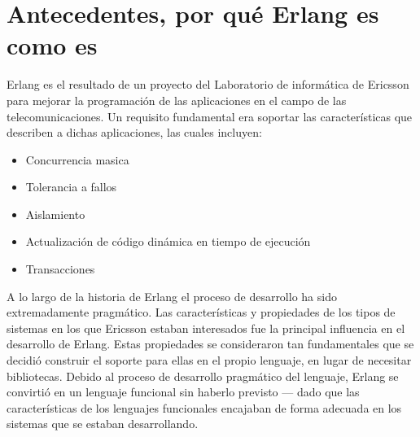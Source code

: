 \chapter{Antecedentes, por qu\'e Erlang es como es}
\label{background}

Erlang es el resultado de un proyecto del Laboratorio de inform\'atica de Ericsson para mejorar la programaci\'on 
de las aplicaciones en el campo de las telecomunicaciones. Un requisito fundamental era soportar las caracter\'isticas
que describen a dichas aplicaciones, las cuales incluyen:

\begin{itemize}
\item Concurrencia masica

\item Tolerancia a fallos

\item Aislamiento

\item Actualizaci\'on de c\'odigo din\'amica en tiempo de ejecuci\'on

\item Transacciones
\end{itemize}

A lo largo de la historia de Erlang el proceso de desarrollo ha sido extremadamente pragm\'atico. Las 
caracter\'isticas y propiedades de los tipos de sistemas en los que Ericsson estaban interesados
fue la principal influencia en el desarrollo de Erlang. Estas propiedades se consideraron tan fundamentales
que se decidi\'o construir el soporte para ellas en el propio lenguaje, en lugar de necesitar bibliotecas.
Debido al proceso de desarrollo pragm\'atico del lenguaje, Erlang se convirti\'o en un lenguaje funcional
sin haberlo previsto --- dado que las caracter\'isticas de los lenguajes funcionales encajaban de forma 
adecuada en los sistemas que se estaban desarrollando.
